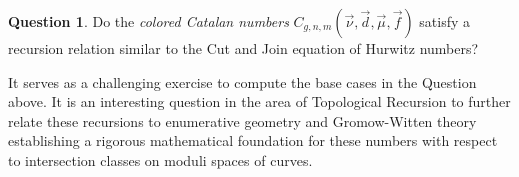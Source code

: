 \documentclass{amsart}
\theoremstyle{definition}
\newtheorem{Quest}[Lem]{Question}
\begin{document}
\begin{Quest}
    Do the {\it colored Catalan numbers} $C_{g,n,m}(\overrightarrow{\nu},\overrightarrow{d},\overrightarrow{\mu},\overrightarrow{f})$ satisfy a recursion relation similar to the Cut and Join equation of Hurwitz numbers?
\end{Quest}

    It serves as a challenging exercise to compute the base cases in the Question above.
     It is an interesting question in the area of Topological Recursion to further relate these recursions to enumerative geometry and Gromow-Witten theory establishing a rigorous mathematical foundation for these numbers with respect to intersection classes on moduli spaces of curves. 
\end{document}
